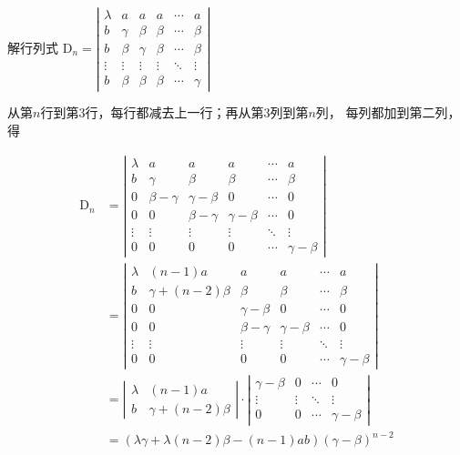 \begin{example}
    解行列式
$\mathrm{D}_{n}=\left|\begin{array}{cccccc}
\lambda & a & a & a & \cdots & a \\
b & \gamma & \beta & \beta & \cdots & \beta \\
b & \beta & \gamma & \beta & \cdots & \beta \\
\vdots & \vdots & \vdots & \vdots & \ddots & \vdots \\
b & \beta & \beta & \beta & \cdots & \gamma
\end{array}\right|$
\end{example}

\begin{solution}
    从第$n$行到第3行，每行都减去上一行；再从第3列到第$n$列，
每列都加到第二列，得

$$
\begin{aligned}
\mathrm{D}_{n}&=
\left|\begin{array}{cccccc}
\lambda & a & a & a & \cdots & a \\
b & \gamma & \beta & \beta & \cdots & \beta \\
0 & \beta-\gamma & \gamma-\beta & 0 & \cdots & 0 \\
0 & 0 & \beta-\gamma & \gamma-\beta & \cdots & 0 \\
\vdots & \vdots & \vdots & \vdots & \ddots & \vdots \\
0 & 0 & 0 & 0 & \cdots & \gamma-\beta
\end{array}\right|\\
&=\left|\begin{array}{cccccc}
\lambda & (n-1)a & a & a & \cdots & a \\
b & \gamma+(n-2)\beta & \beta & \beta & \cdots & \beta \\
0 & 0 & \gamma-\beta & 0 & \cdots & 0 \\
0 & 0 & \beta-\gamma & \gamma-\beta & \cdots & 0 \\
\vdots & \vdots & \vdots & \vdots & \ddots & \vdots \\
0 & 0 & 0 & 0 & \cdots & \gamma-\beta
\end{array}\right|\\
&=\left|\begin{array}{cc}
\lambda & (n-1)a \\
b & \gamma+(n-2)\beta
\end{array}\right| \cdot
\left|\begin{array}{cccc}
\gamma-\beta & 0 & \cdots & 0 \\
\vdots & \vdots & \ddots & \vdots \\
0 & 0 & \cdots & \gamma-\beta
\end{array}\right|\\
&=(\lambda \gamma+\lambda(n-2)\beta-(n-1)ab)(\gamma-\beta)^{n-2}  
\end{aligned}
$$
\end{solution}

